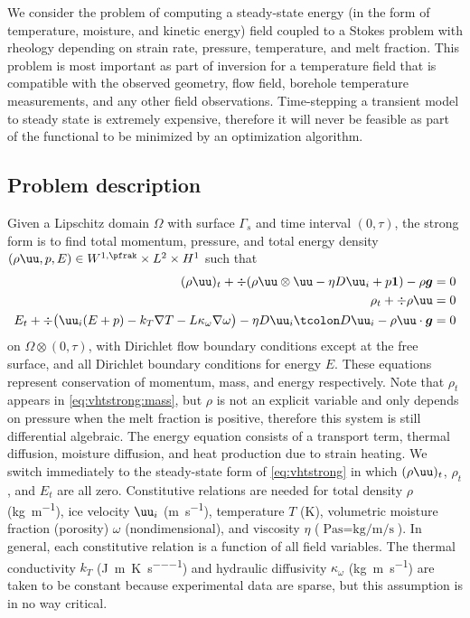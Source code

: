 We consider the problem of computing a steady-state energy (in the form of temperature, moisture, and kinetic energy) field coupled to a Stokes problem with rheology depending on strain rate, pressure, temperature, and melt fraction.
This problem is most important as part of inversion for a temperature field that is compatible with the observed geometry, flow field, borehole temperature measurements, and any other field observations.
Time-stepping a transient model to steady state is extremely expensive, therefore it will never be feasible as part of the functional to be minimized by an optimization algorithm.

\subsection{Problem description}\label{ssec:vhtproblem}
Given a Lipschitz domain $\Omega$ with surface $\Gamma_s$ and time interval $(0,\tau)$, the strong form is to find total momentum, pressure, and total energy density $(\rho\uu,p,E) \in W^{1,\pfrak} \times L^2 \times H^1$ such that
\begin{subequations}\label{eq:vhtstrong}
  \begin{align}
    (\rho\uu)_t + \div (\rho\uu\otimes\uu - \eta D\uu_i + p\bm 1) - \rho \bm g &= 0 \label{eq:vhtstrong:momentum} \\
    \rho_t + \div \rho\uu &= 0 \label{eq:vhtstrong:mass} \\
    E_t + \div \big(\uu_i(E+p) - k_T\nabla T - L \kappa_\omega\nabla\omega \big) - \eta D\uu_i\tcolon D\uu_i - \rho\uu\cdot\bm g &= 0 \label{eq:vhtstrong:energy}
  \end{align}
\end{subequations}
on $\Omega\otimes (0,\tau)$, with Dirichlet flow boundary conditions except at the free surface, and all Dirichlet boundary conditions for energy $E$.
These equations represent conservation of momentum, mass, and energy respectively.
Note that $\rho_t$ appears in \eqref{eq:vhtstrong:mass}, but $\rho$ is not an explicit variable and only depends on pressure when the melt fraction is positive, therefore this system is still differential algebraic.
The energy equation consists of a transport term, thermal diffusion, moisture diffusion, and heat production due to strain heating.
We switch immediately to the steady-state form of \eqref{eq:vhtstrong} in which $(\rho\uu)_t$, $\rho_t$, and $E_t$ are all zero.
Constitutive relations are needed for total density $\rho$ (\si{\kilogram\per\metre}), ice velocity $\uu_i$ (\si{\metre\per\second}), temperature $T$ (\si{\kelvin}), volumetric moisture fraction (porosity) $\omega$ (nondimensional), and viscosity $\eta$ ($\si{\pascal\second} = \si{\kilogram\per\metre\per\second}$).
In general, each constitutive relation is a function of all field variables.
The thermal conductivity $k_T$ (\si{\joule\per\metre\per\kelvin\per\second}) and hydraulic diffusivity $\kappa_\omega$ (\si{\kilogram\metre\per\second}) are taken to be constant because experimental data are sparse, but this assumption is in no way critical.

